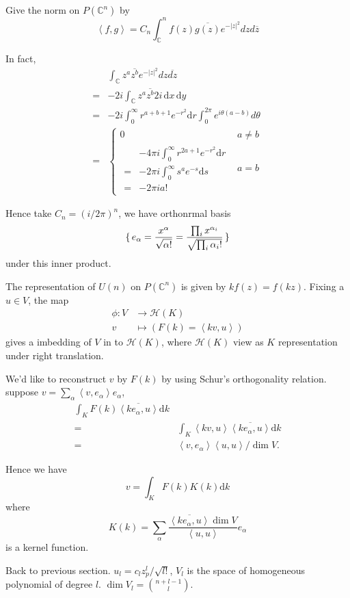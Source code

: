 \documentclass[12pt]{article}
\def\bC{{\mathbb{C}}}
\def\sH{\mathcal{H}}
\def\inn#1#2{\left\langle{#1},{#2}\right\rangle}
\def\abs#1{\left|{#1}\right|}
\begin{document}
Give the norm on $P(\bC^n)$ by
\[
\inn{f}{g} = C_n\int_\bC^nf(z)\overline{g(z)}e^{-\abs{z}^2}dzd\overline{z}
\]

\def\dd{\mathrm{d}}

In fact, 
\[
\begin{split}
 &\int_\bC z^a \overline{z^b} e^{-\abs{z}^2}dz\overline{dz} \\
=& -2i \int_\bC z^a \overline{z^b} 2i\,\dd x\,\dd y\\
=& -2i\int_{0}^\infty r^{a+b+1}e^{-r^2}\dd r \int_0^{2\pi} e^{i\theta(a-b)}d\theta\\
=& \begin{cases}
0 & a\neq b\\
\begin{split}
 &-4\pi i\int_0^\infty r^{2a+1} e^{-r^2} \dd r \\
=& -2\pi i \int_0^\infty s^a e^{-s}\dd s \\
=& -2\pi i a! 
\end{split}
& a=b 
\end{cases}
\end{split}
\]

Hence take $C_n = (i/2\pi)^n$, we have orthonrmal basis 
\[
\set{e_\alpha = \frac{x^\alpha}{\sqrt{\alpha!}}=\frac{\prod_i x^{\alpha_i}}{\sqrt{\prod_i \alpha_i!}}}
\]
under this inner product.

The representation of $U(n)$ on $P(\bC^n)$ is given by  $k f(z)  =f(kz)$. 
Fixing a $u\in V$, the map 
\begin{align*}
\phi\colon V &\to  \sH(K)\\
v & \mapsto (F(k)=\inn{kv}{u})
\end{align*}
gives a imbedding of $V$ in to $\sH(K)$, 
where $\sH(K)$ view as $K$ representation under right translation.

We'd like to reconstruct $v$ by $F(k)$ by using Schur's orthogonality relation. 
suppose $v = \sum_{\alpha} \inn{v}{e_\alpha} e_\alpha$, 
\[
\begin{split}
\int_K F(k) \overline{\inn{ke_\alpha}{u}} \dd k \\
= &\int_K  \inn{kv}{u}\overline{\inn{ke_\alpha}{u}}\dd k\\
= &\inn{v}{e_\alpha}\inn{u}{u}/\dim V.
\end{split}
\]

Hence we have 
\[
v = \int_K F(k) K(k) \dd k
\]
where 
\[
K(k) = \sum_{\alpha} \frac{\overline{\inn{ke_\alpha}{u}}\dim V}{\inn{u}{u}} e_\alpha 
\]
is a kernel function. 

Back to previous section. $u_l = c_l z_p^l/\sqrt{l!}$, $V_l$ is the space of homogeneous polynomial of degree $l$.
$\dim V_l  = \binom{n+l-1}{l}$.
   
\end{document}
